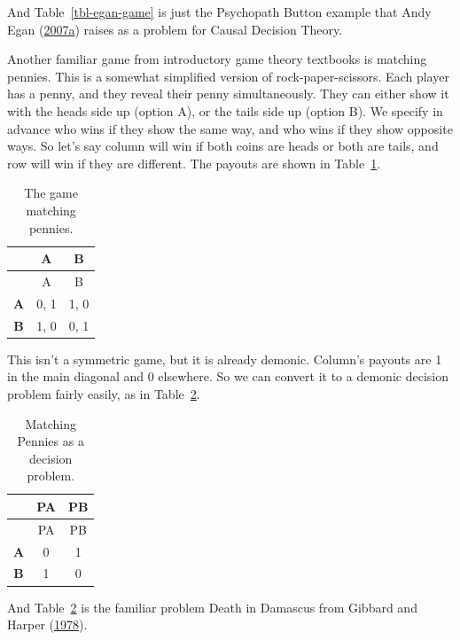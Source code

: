 \documentclass[
  12pt,
  letterpaper,
  DIV=11,
  numbers=noendperiod]{scrreprt}
\begin{document}
And Table~\ref{tbl-egan-game} is just the Psychopath Button example that
Andy Egan (\protect\hyperlink{ref-Egan2007}{2007a}) raises as a problem
for Causal Decision Theory.

Another familiar game from introductory game theory textbooks is
matching pennies. This is a somewhat simplified version of
rock-paper-scissors. Each player has a penny, and they reveal their
penny simultaneously. They can either show it with the heads side up
(option A), or the tails side up (option B). We specify in advance who
wins if they show the same way, and who wins if they show opposite ways.
So let's say column will win if both coins are heads or both are tails,
and row will win if they are different. The payouts are shown in
Table~\ref{tbl-match-pennies}.

\hypertarget{tbl-match-pennies}{}
\begin{longtable}[]{@{}ccc@{}}
\caption{\label{tbl-match-pennies}The game matching
pennies.}\tabularnewline
\toprule\noalign{}
& A & B \\
\midrule\noalign{}
\endfirsthead
\toprule\noalign{}
& A & B \\
\midrule\noalign{}
\endhead
\bottomrule\noalign{}
\endlastfoot
\textbf{A} & 0, 1 & 1, 0 \\
\textbf{B} & 1, 0 & 0, 1 \\
\end{longtable}

This isn't a symmetric game, but it is already demonic. Column's payouts
are 1 in the main diagonal and 0 elsewhere. So we can convert it to a
demonic decision problem fairly easily, as in
Table~\ref{tbl-death-in-damascus}.

\hypertarget{tbl-death-in-damascus}{}
\begin{longtable}[]{@{}ccc@{}}
\caption{\label{tbl-death-in-damascus}Matching Pennies as a decision
problem.}\tabularnewline
\toprule\noalign{}
& PA & PB \\
\midrule\noalign{}
\endfirsthead
\toprule\noalign{}
& PA & PB \\
\midrule\noalign{}
\endhead
\bottomrule\noalign{}
\endlastfoot
\textbf{A} & 0 & 1 \\
\textbf{B} & 1 & 0 \\
\end{longtable}

And Table~\ref{tbl-death-in-damascus} is the familiar problem Death in
Damascus from Gibbard and Harper
(\protect\hyperlink{ref-GibbardHarper1978}{1978}).
\end{document}
